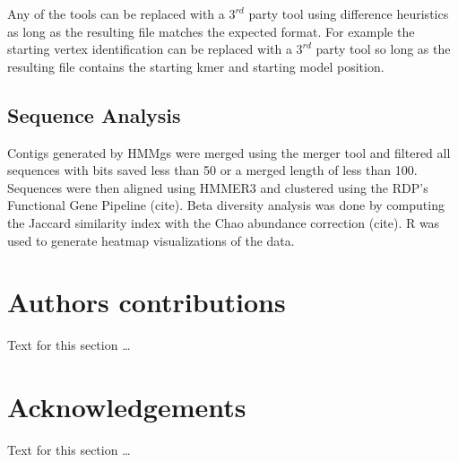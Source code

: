 \documentclass[10pt]{bmc_article}
\newenvironment{bmcformat}{\begin{raggedright}\baselineskip20pt\sloppy\setboolean{publ}{false}}{\end{raggedright}\baselineskip20pt\sloppy}
\begin{document}
\begin{bmcformat}
Any of the tools can be replaced with a $3^{rd}$ party tool using difference heuristics as long as the resulting file matches the expected format.  For example the starting vertex identification can be replaced with a $3^{rd}$ party tool so long as the resulting file contains the starting kmer and starting model position.

\subsection*{Sequence Analysis}
Contigs generated by HMMgs were merged using the merger tool and filtered all sequences with bits saved less than 50 or a merged length of less than 100.  Sequences were then aligned using HMMER3 and clustered using the RDP's Functional Gene Pipeline (cite).  Beta diversity analysis was done by computing the Jaccard similarity index with the Chao abundance correction (cite).  R was used to generate heatmap visualizations of the data.



    
\section*{Authors contributions}
    Text for this section \ldots

    

\section*{Acknowledgements}
  Text for this section \ldots


 



\end{bmcformat}
\end{document}
